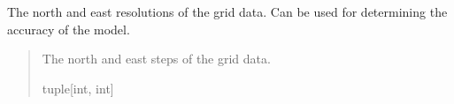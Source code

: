 \documentclass[letterpaper,10pt,english]{sphinxmanual}
\begin{document}
\begin{fulllineitems}
\begin{fulllineitems}
\label{\detokenize{modules/earth/geoid:qnav.earth.geoid.GeoidPGM.resolution}}
\pysigstartsignatures
{}
\pysigstopsignatures
\sphinxAtStartPar
The north and east resolutions of the grid data.
Can be used for determining the accuracy of the model.
\begin{quote}\begin{description}
\sphinxAtStartPar
The north and east steps of the grid data.

\sphinxAtStartPar
tuple{[}int, int{]}

\end{description}\end{quote}

\end{fulllineitems}


\end{fulllineitems}

\end{document}
